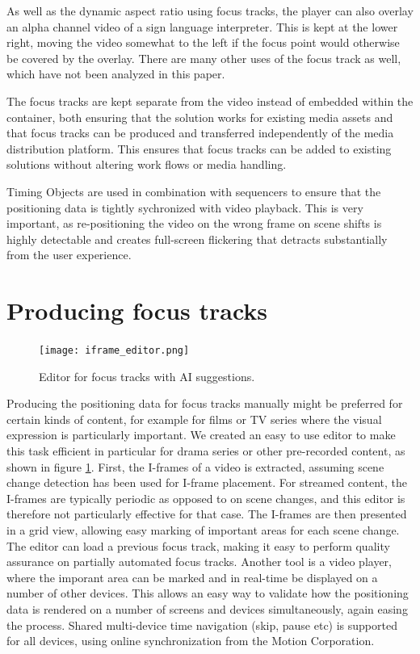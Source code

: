 \documentclass{aircc}
\begin{document}
As well as the dynamic aspect ratio using focus tracks, the player can also
overlay an alpha channel video of a sign language interpreter. This is kept
at the lower right, moving the video somewhat to the left if the focus point
would otherwise be covered by the overlay. There are many other uses of the
focus track as well, which have not been analyzed in this paper.

The focus tracks are kept separate from the video instead of embedded within
the container, both ensuring that the solution works for existing media
assets and that focus tracks can be produced and transferred independently of
the media distribution platform. This ensures that focus tracks can be added
to existing solutions without altering work flows or media handling.

Timing Objects \cite{Arntzen2018,timingobject} are used in combination with
sequencers \cite{sequencer} to ensure that the positioning data is tightly
sychronized with video playback. This is very important, as re-positioning
the video on the wrong frame on scene shifts is highly detectable and creates
full-screen flickering that detracts substantially from the user experience.


\section{Producing focus tracks}

\begin{figure}
\begin{center}
\texttt{[image: iframe\_editor.png]}
\caption{Editor for focus tracks with AI suggestions.}
\label{iframe_editor}
\end{center}
\end{figure}

Producing the positioning data for focus tracks manually might be preferred
for certain kinds of content, for example for films or TV series where the
visual expression is particularly important. We created an easy to use editor
to make this task efficient in particular for drama series or other
pre-recorded content, as shown in figure \ref{iframe_editor}. First, the
I-frames of a video is extracted, assuming scene change detection has been
used for I-frame placement. For streamed content, the I-frames are typically
periodic as opposed to on scene changes, and this editor is therefore not
particularly effective for that case. The I-frames are then presented in a
grid view, allowing easy marking of important areas for each scene change.
The editor can load a previous focus track, making it easy to perform quality
assurance on partially automated focus tracks. Another tool is a video
player, where the imporant area can be marked and in real-time be displayed
on a number of other devices. This allows an easy way to validate how the
positioning data is rendered on a number of screens and devices
simultaneously, again easing the process. Shared multi-device time navigation
(skip, pause etc) is supported for all devices, using online synchronization
from the Motion Corporation\cite{inMotion}.
\end{document}
